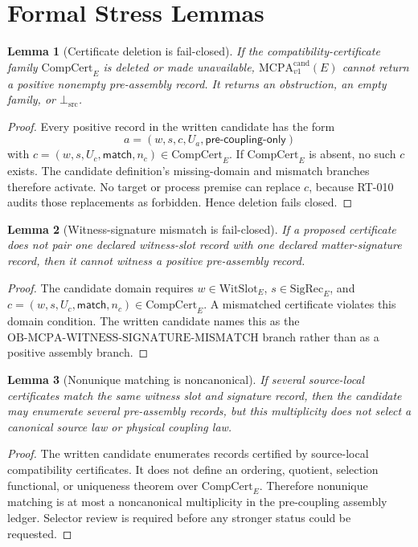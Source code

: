 \documentclass[11pt]{article}
\newcommand{\MCPACand}{\mathrm{MCPA}^{\mathrm{cand}}_{v1}}
\newcommand{\WitSlot}{\mathrm{WitSlot}}
\newcommand{\SigRec}{\mathrm{SigRec}}
\newcommand{\CompCert}{\mathrm{CompCert}}
\newcommand{\BottomSrc}{\bot_{\mathrm{src}}}
\newtheorem{lemma}{Lemma}
\begin{document}
\section{Formal Stress Lemmas}

\begin{lemma}[Certificate deletion is fail-closed]
If the compatibility-certificate family \(\CompCert_E\) is deleted or made
unavailable, \(\MCPACand(E)\) cannot return a positive nonempty pre-assembly
record. It returns an obstruction, an empty family, or \(\BottomSrc\).
\end{lemma}

\begin{proof}
Every positive record in the written candidate has the form
\[
  a=(w,s,c,U_a,\mathsf{pre\text{-}coupling\text{-}only})
\]
with \(c=(w,s,U_c,\mathsf{match},n_c)\in\CompCert_E\). If
\(\CompCert_E\) is absent, no such \(c\) exists. The candidate definition's
missing-domain and mismatch branches therefore activate. No target or process
premise can replace \(c\), because RT-010 audits those replacements as
forbidden. Hence deletion fails closed.
\end{proof}

\begin{lemma}[Witness-signature mismatch is fail-closed]
If a proposed certificate does not pair one declared witness-slot record with
one declared matter-signature record, then it cannot witness a positive
pre-assembly record.
\end{lemma}

\begin{proof}
The candidate domain requires \(w\in\WitSlot_E\), \(s\in\SigRec_E\), and
\(c=(w,s,U_c,\mathsf{match},n_c)\in\CompCert_E\). A mismatched certificate
violates this domain condition. The written candidate names this as the
\(\mathrm{OB\text{-}MCPA\text{-}WITNESS\text{-}SIGNATURE\text{-}MISMATCH}\)
branch rather than as a positive assembly branch.
\end{proof}

\begin{lemma}[Nonunique matching is noncanonical]
If several source-local certificates match the same witness slot and
signature record, then the candidate may enumerate several pre-assembly
records, but this multiplicity does not select a canonical source law or
physical coupling law.
\end{lemma}

\begin{proof}
The written candidate enumerates records certified by source-local
compatibility certificates. It does not define an ordering, quotient,
selection functional, or uniqueness theorem over \(\CompCert_E\). Therefore
nonunique matching is at most a noncanonical multiplicity in the
pre-coupling assembly ledger. Selector review is required before any stronger
status could be requested.
\end{proof}
\end{document}

